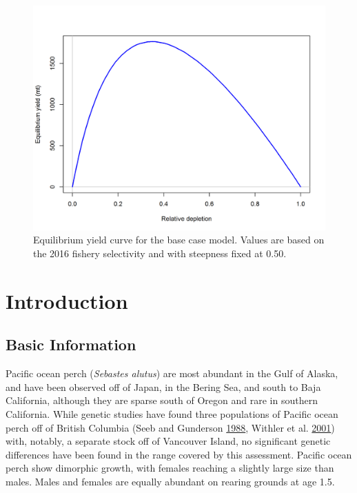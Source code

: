 \documentclass[12pt,]{article}
\begin{document}
\FloatBarrier

\begin{figure}
\centering
\includegraphics{r4ss/plots_mod1/yield1_yield_curve.png}
\caption{Equilibrium yield curve for the base case model. Values are
based on the 2016 fishery selectivity and with steepness fixed at 0.50.
\label{fig:Yield_all}}
\end{figure}

\FloatBarrier

\newpage

\renewcommand{\thefigure}{\arabic{figure}}
\renewcommand{\thetable}{\arabic{table}}

\setcounter{figure}{0} \setcounter{table}{0}


\section{Introduction}\label{introduction}

\subsection{Basic Information}\label{basic-information}

Pacific ocean perch (\emph{Sebastes alutus}) are most abundant in the
Gulf of Alaska, and have been observed off of Japan, in the Bering Sea,
and south to Baja California, although they are sparse south of Oregon
and rare in southern California. While genetic studies have found three
populations of Pacific ocean perch off of British Columbia (Seeb and
Gunderson \protect\hyperlink{ref-seeb_genetic_1988}{1988}, Withler et
al. \protect\hyperlink{ref-withler_co-existing_2001}{2001}) with,
notably, a separate stock off of Vancouver Island, no significant
genetic differences have been found in the range covered by this
assessment. Pacific ocean perch show dimorphic growth, with females
reaching a slightly large size than males. Males and females are equally
abundant on rearing grounds at age 1.5.
\end{document}

